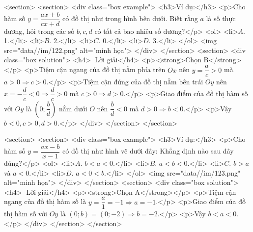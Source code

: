     <section>
        <section>
            <div class="box example">
                <h3>Ví dụ:</h3>
                <p>Cho hàm số \(y = \dfrac{ax+b}{cx+d}\) có đồ thị như trong hình bên dưới. Biết rằng \(a\) là số thực dương, hỏi trong các số \(b, c, d\) có tất cả bao nhiêu số dương?</p>
                <ol>
                    <li>\(A.\) 1.</li>
                    <li>\(B.\) 2.</li>
                    <li>\(C.\) 0.</li>
                    <li>\(D.\) 3.</li>
                </ol>
                <img src="data//im/122.png" alt="minh họa">
            </div>
        </section>
        <section>
            <div class="box solution">
                <h4>📝 Lời giải</h4>
                <p><strong>Chọn B</strong></p>
                <p>Tiệm cận ngang của đồ thị nằm phía trên \(Ox\) nên \(y = \dfrac{a}{c} > 0\) mà \(a>0 \Rightarrow c>0\).</p>
                <p>Tiệm cận đứng của đồ thị nằm bên trái \(Oy\) nên \(x = -\dfrac{d}{c} < 0 \Rightarrow \dfrac{d}{c} > 0\) mà \(c>0 \Rightarrow d>0\).</p>
                <p>Giao điểm của đồ thị hàm số với \(Oy\) là \(\left(0; \dfrac{b}{d}\right)\) nằm dưới \(O\) nên \(\dfrac{b}{d} < 0\) mà \(d>0 \Rightarrow b<0\).</p>
                <p>Vậy \(b < 0, c > 0, d > 0\).</p>
            </div>
        </section>
    </section>

    <section>
        <section>
            <div class="box example">
                <h3>Ví dụ:</h3>
                <p>Cho hàm số \(y = \dfrac{ax-b}{x-1}\) có đồ thị như hình vẽ dưới đây: Khẳng định nào sau đây đúng?</p>
                <ol>
                    <li>\(A.\) \(b < a < 0\).</li>
                    <li>\(B.\) \(a < b < 0\).</li>
                    <li>\(C.\) \(b > a\) và \(a < 0\).</li>
                    <li>\(D.\) \(a < 0 < b\).</li>
                </ol>
                <img src="data//im/123.png" alt="minh họa">
            </div>
        </section>
        <section>
            <div class="box solution">
                <h4>📝 Lời giải</h4>
                <p><strong>Chọn A</strong></p>
                <p>Tiệm cận ngang của đồ thị hàm số là \(y = \dfrac{a}{1} = -1 \Rightarrow a = -1\).</p>
                <p>Giao điểm của đồ thị hàm số với \(Oy\) là \((0; b) = (0; -2) \Rightarrow b = -2\).</p>
                <p>Vậy \(b < a < 0\).</p>
            </div>
        </section>
    </section>

